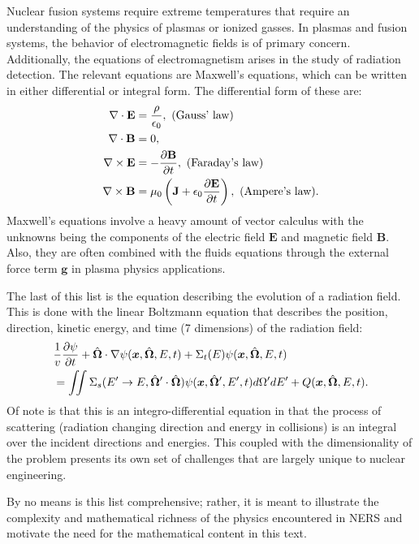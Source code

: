 Nuclear fusion systems require extreme temperatures that require an understanding of the physics of plasmas or ionized gasses. In plasmas and fusion systems, the behavior of electromagnetic fields is of primary concern. Additionally, the equations of electromagnetism arises in the study of radiation detection. The relevant equations are Maxwell's equations, which can be written in either differential or integral form. The differential form of these are:
\begin{subequations}
\begin{align}
  \nabla \cdot \mathbf{E} &= \frac{\rho}{\epsilon_0}, \text{ (Gauss' law)} \\
  \nabla \cdot \mathbf{B} &= 0, \\
  \nabla \times \mathbf{E} &= -\frac{ \partial {\mathbf{B}} }{ \partial {t} }, \text{ (Faraday's law)} \\
  \nabla \times \mathbf{B} &= \mu_0 \left( \mathbf{J} + \epsilon_0 \frac{ \partial {\mathbf{E}} }{ \partial {t} } \right), \text{ (Ampere's law)}.
\end{align}
\end{subequations}
Maxwell's equations involve a heavy amount of vector calculus with the unknowns being the components of the electric field $\mathbf{E}$ and magnetic field $\mathbf{B}$. Also, they are often combined with the fluids equations through the external force term $\mathbf{g}$ in plasma physics applications.

The last of this list is the equation describing the evolution of a radiation field. This is done with the linear Boltzmann equation that describes the position, direction, kinetic energy, and time (7 dimensions) of the radiation field:
\begin{align}
  &\frac{1}{v} \frac{ \partial {\psi} }{ \partial {t} } + \hat{\mathbf{\Omega}} \cdot \nabla \psi(\bm{x},\hat{\mathbf{\Omega}},E,t) + \Sigma_t(E) \psi(\bm{x},\hat{\mathbf{\Omega}},E,t) \nonumber \\
  &= \iint \Sigma_s(E' \rightarrow E, \hat{\mathbf{\Omega}}' \cdot \hat{\mathbf{\Omega}} )  \psi(\bm{x},\hat{\mathbf{\Omega}}',E',t) d\Omega' dE' + Q(\bm{x},\hat{\mathbf{\Omega}},E,t).
\end{align}
Of note is that this is an integro-differential equation in that the process of scattering (radiation changing direction and energy in collisions) is an integral over the incident directions and energies. This coupled with the dimensionality of the problem presents its own set of challenges that are largely unique to nuclear engineering.

By no means is this list comprehensive; rather, it is meant to illustrate the complexity and mathematical richness of the physics encountered in NERS and motivate the need for the mathematical content in this text.

